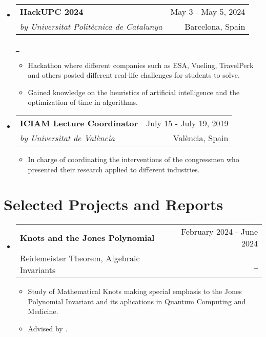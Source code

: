 \documentclass[a4paper,11pt,dvipsnames]{article}
\makeatletter
\newcommand{\espai}{\symbol{32}\symbol{32}\symbol{32}\symbol{32}\symbol{32}\symbol{32}\symbol{32}\symbol{32}\symbol{32}\symbol{32}\symbol{32}\symbol{32}\symbol{32}\symbol{32}\symbol{32}\symbol{32}\symbol{32}\symbol{32}\symbol{32}\symbol{32}\symbol{32}\symbol{32}\symbol{32}\symbol{32}\symbol{32}\symbol{32}\symbol{32}\symbol{32}\symbol{32}\symbol{32}\symbol{32}\symbol{32}\symbol{32}\symbol{32}\symbol{32}\symbol{32}\symbol{32}\symbol{32}\symbol{32}\symbol{32}\symbol{32}\symbol{32}\symbol{32}\symbol{32}\symbol{32}\symbol{32}\symbol{32}\symbol{32}\symbol{32}\symbol{32}\symbol{32}\symbol{32}\symbol{32}\symbol{32}\symbol{32}\symbol{32}\symbol{32}\symbol{32}\symbol{32}\symbol{32}\symbol{32}\symbol{32}\symbol{32}\symbol{32}\symbol{32}\symbol{32}\symbol{32}\symbol{32}\symbol{32}\symbol{32}\symbol{32}\symbol{32}\symbol{32}\symbol{32}\symbol{32}\symbol{32}\symbol{32}\symbol{32}\symbol{32}\symbol{32}\symbol{32}\symbol{32}\symbol{32}\symbol{32}\symbol{32}\symbol{32}\symbol{32}\symbol{32}\symbol{32}\symbol{32}\symbol{32}\symbol{32}\symbol{32}\symbol{32}\symbol{32}\symbol{32}\symbol{32}\symbol{32}\symbol{32}\symbol{32}\symbol{32}\symbol{32}\symbol{32}\symbol{32}\symbol{32}\symbol{32}\symbol{32}\symbol{32}\symbol{32}\symbol{32}\symbol{32}\symbol{32}\symbol{32}\symbol{32}\symbol{32}\symbol{32}\symbol{32}\symbol{32}\symbol{32}\symbol{32}\symbol{32}\symbol{32}\symbol{32}\symbol{32}\symbol{32}\symbol{32}\symbol{32}\symbol{32}\symbol{32}\symbol{32}\symbol{32}\symbol{32}\symbol{32}\symbol{32}\symbol{32}\symbol{32}\symbol{32}\symbol{32}\symbol{32}\symbol{32}\symbol{32}\symbol{32}\symbol{32}\symbol{32}\symbol{32}\symbol{32}\symbol{32}\symbol{32}\symbol{32}\symbol{32}\symbol{32}\symbol{32}\symbol{32}\symbol{32}\symbol{32}\symbol{32}\symbol{32}\symbol{32}\symbol{32}\symbol{32}\symbol{32}\symbol{32}\symbol{32}\symbol{32}\symbol{32}\symbol{32}\symbol{32}\symbol{32}\symbol{32}\symbol{32}\symbol{32}\symbol{32}\symbol{32}\symbol{32}\symbol{32}\symbol{32}\symbol{32}\symbol{32}\symbol{32}\symbol{32}\symbol{32}}
\newcommand{\resumeQuadHeading}[4]{
	\item
	\begin{tabular*}{0.96\textwidth}[t]{l@{\extracolsep{\fill}}r}
		\textbf{#1} & \small #2 \\
		\small#3 & \small #4 \\
	\end{tabular*}
}
\newcommand{\resumeHeadingListStart}{
	\begin{itemize}[leftmargin=0.15in, label={}]
	}
\newcommand{\resumeHeadingListEnd}{\end{itemize}}
\makeatother
\begin{document}
	\resumeHeadingListStart{}
	\resumeQuadHeading{HackUPC 2024 \tcbox{\color{white}\textbf{C++}}\hspace*{1mm}\tcbox{\color{white}\textbf{AI}}\hspace*{1mm}\tcbox{\color{white}\textbf{Programming}}}{May 3 - May 5, 2024}{\textit{by Universitat Politècnica de Catalunya}}{Barcelona, Spain}{\espai}{\href{https://github.com/Tutusaus/HackUPC2024}{\faGithub \ }}
	\begin{itemize}[leftmargin=3em, itemsep=0.1em, topsep=2pt]
		\item \small Hackathon where different companies such as ESA, Vueling, TravelPerk and others posted different real-life challenges for students to solve.
		\item \small Gained knowledge on the heuristics of artificial intelligence and the optimization of time in algorithms.
	\end{itemize}
	\resumeHeadingListEnd{}
	
	\resumeHeadingListStart{}
	\resumeQuadHeading{ICIAM Lecture Coordinator }{July 15 - July 19, 2019}{\textit{by Universitat de València}}{València, Spain}
	\begin{itemize}[leftmargin=3em, itemsep=0.1em, topsep=2pt]
		\item \small In charge of coordinating the interventions of the congressmen who presented their research applied to different industries.
	\end{itemize}
	\resumeHeadingListEnd{}
	
	
	\section{Selected Projects and Reports}
	\resumeHeadingListStart{}
	\resumeQuadHeading{Knots and the Jones Polynomial}{February 2024 - June 2024}{Reidemeister Theorem, Algebraic Invariants}{\href{https://github.com/Tutusaus/Knot_Theory/blob/master/TFG/main.pdf}{\faFileTextO \ \graydotuline{Report}}}
	\begin{itemize}[leftmargin=3em, itemsep=0.1em, topsep=2pt]
		\item \small Study of Mathematical Knots making special emphasis to the Jones Polynomial Invariant and its aplications in Quantum Computing and Medicine.
		\item \small Advised by \href{https://portalrecerca.uab.cat/en/persons/joan-porti-pique-3}{}.
	\end{itemize}
	\resumeHeadingListEnd{}
	
\end{document}

